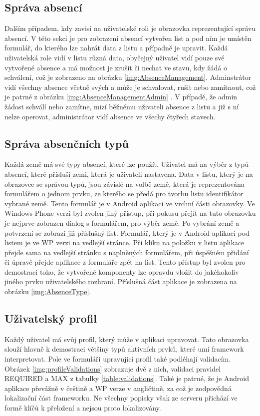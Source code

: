 \subsection{Správa absencí}
Dalším případem, kdy zavisí na uživatelské roli je obrazovka reprezentující správu absencí. V této sekci je pro zobrazení absencí vytvořen list a pod ním je umístěn formulář, do kterého lze nahrát data z listu a případně je upravit. Každá uživatelská role vidí v listu různá data, obyčejný uživatel vidí pouze své vytvořené absence a má možnost je zrušit či nechat ve stavu, kdy žádá o schválení, což je zobrazeno na obrázku \ref{img:AbsenceManagement}. Adminstrátor vidí všechny absence včetně svých a může je schvalovat, rušit nebo zamítnout, což je patrné z obrázku \ref{img:AbsenceManagementAdmin} . V případě, že admin žádost schválí nebo zamítne, mizí běžnému uživateli absence z listu a již s ní nelze operovat, administrátor vidí absence ve všechy čtyřech stavech. 
\subsection{Správa absenčních typů}
Každá země má své typy absencí, které lze použít. Uživatel má na výběr z typů absencí, které přísluší zemi, která je uživateli nastavena. Data v listu, který je na obrazovce se správou typů, jsou závislé na volbě země, která je reprezentována formulářem o jednom prvku, ze kterého se předá pro tvorbu listu identifikátor vybrané země. Tento formulář je v Android aplikaci ve vrchní části obrazovky. Ve Windows Phone verzi byl zvolen jiný přístup, při pokusu přejít na tuto obrazovku je nejprve zobrazen dialog s formulářem, pro výběr země. Po vybrání země a potvrzení se zobrazí již příslušný list. Formulář, který je v Android aplikaci pod listem je ve WP verzi na vedlejší stránce. Při kliku na položku v listu aplikace přejde sama na vedlejší stránku s naplněných formulářem, při úspěšném přidání či úpravě přejde aplikace z formuláře zpět na list. Tento přístup byl zvolen pro demostraci toho, že vytvořené komponenty lze opravdu vložit do jakéhokoliv jiného prvku uživatelského rozhraní. Příslušná část aplikace je zobrazena na obrázku \ref{img:AbsenceType}.
\subsection{Uživatelský profil}
Každý uživatel má svůj profil, který může v aplikaci upravovat. Tato obrazovka slouží hlavně k demostraci většiny typů aktivních prvků, které umí framework interpretovat. Pole ve formuláři upravující profil také podléhají validacím. Obrázek \ref{img:profileValidations} zobrazuje dvě z nich, validaci pravidel REQUIRED a MAX z tabulky \ref{table:validations}. Také je patrné, že je Android aplikace převážně v češtině a WP verze v angličtině, za což je zodpovědná lokalizační část frameworku. Ne všechny popisky však ze serveru přichází ve formě klíčů k přeložení a nejsou proto lokalizovány. 
